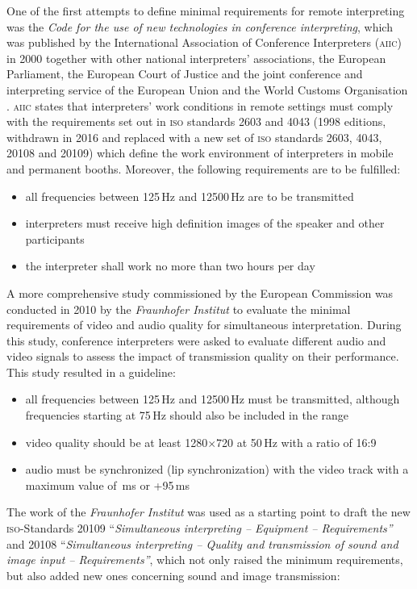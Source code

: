 \documentclass[output=paper]{langsci/langscibook}
\begin{document}
One of the first attempts to define minimal requirements for remote interpreting was the \textit{Code for the use of new technologies in conference interpreting}, which was published by the International Association of Conference Interpreters (\textsc{aiic}) in 2000 together with other national interpreters' associations, the European Parliament, the European Court of Justice and the joint conference and interpreting service of the European Union and the World Customs Organisation \citep[31]{Korak2010}. \textsc{aiic} states that interpreters’ work conditions in remote settings must comply with the requirements set out in \textsc{iso} standards 2603 and 4043 (1998 editions, withdrawn in 2016 and replaced with a new set of \textsc{iso} standards 2603, 4043, 20108 and 20109) which define the work environment of interpreters in mobile and permanent booths. Moreover, the following requirements are to be fulfilled:

\begin{itemize}
\item all frequencies between 125\,Hz and 12500\,Hz are to be transmitted
\item interpreters must receive high definition images of the speaker and other participants 
\item the interpreter shall work no more than two hours per day \citep[2]{AIIC2000}
\end{itemize}

A more comprehensive study commissioned by the European Commission was conducted in 2010 by the \textit{Fraunhofer Institut} to evaluate the minimal requirements of video and audio quality for simultaneous interpretation. During this study, conference interpreters were asked to evaluate different audio and video signals to assess the impact of transmission quality on their performance. This study resulted in a guideline:

\begin{itemize}
\item all frequencies between 125\,Hz and 12500\,Hz must be transmitted, although frequencies starting at 75\,Hz should also be included in the range
\item video quality should be at least 1280$\times$720 at 50\,Hz with a ratio of 16:9
\item audio must be synchronized (lip synchronization) with the video track with a maximum value of \,ms or +95\,ms
\end{itemize}

The work of the \textit{Fraunhofer Institut} was used as a starting point to draft the new \textsc{iso}-Standards 20109 ``\textit{Simultaneous interpreting -- Equipment -- Requirements''} and 20108 ``\textit{Simultaneous interpreting -- Quality and transmission of sound and image input -- Requirements''}, which not only raised the minimum requirements, but also added new ones concerning sound and image transmission:
\end{document}
